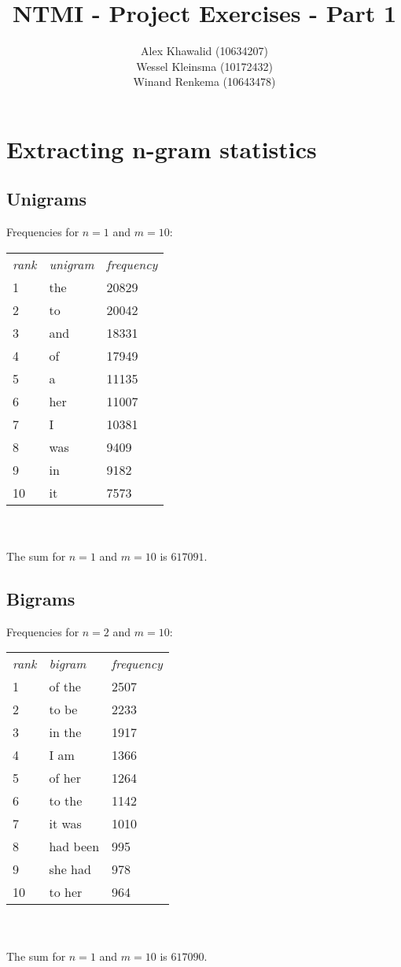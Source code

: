 \documentclass[10pt,a4paper]{article}
\title{NTMI - Project Exercises - Part 1}
\author{
Alex Khawalid (10634207)\\
Wessel Kleinsma (10172432)\\
Winand Renkema (10643478)\\
}
\begin{document}
\maketitle

\section{Extracting n-gram statistics}

\subsection{Unigrams}
Frequencies for $n = 1$ and $m = 10$:\\

\begin{tabular}{l l l}
\textit{rank}&	\textit{unigram}	& \textit{frequency} \\
1	&	the		& 20829 \\
2	&	to		& 20042 \\
3	&	and		& 18331\\
4	&	of		& 17949\\
5	&	a		& 11135\\
6	&	her		& 11007\\
7	&	I		& 10381\\
8	&	was		& 9409\\
9	&	in		& 9182\\
10	&	it		& 7573\\
\end{tabular}\\
\\
The sum for $n = 1$ and $m = 10$ is $617091$.

\subsection{Bigrams}
Frequencies for $n = 2$ and $m = 10$:\\

\begin{tabular}{l l l}
\textit{rank}&	\textit{bigram}	& \textit{frequency} \\
1	&	of the		&  2507	\\
2	&	to be		&  2233	\\ 
3	&	in the		&  1917	\\ 
4	&	I am		&  1366	\\ 
5	&	of her		&  1264	\\ 
6	&	to the		&  1142	\\ 
7	&	it was		&  1010	\\ 
8	&	had been	&  995	\\ 
9	&	she had		&  978	\\ 
10	&	to her		&  964	\\ 
\end{tabular}\\
\\
The sum for $n = 1$ and $m = 10$ is $617090$.
\end{document}
